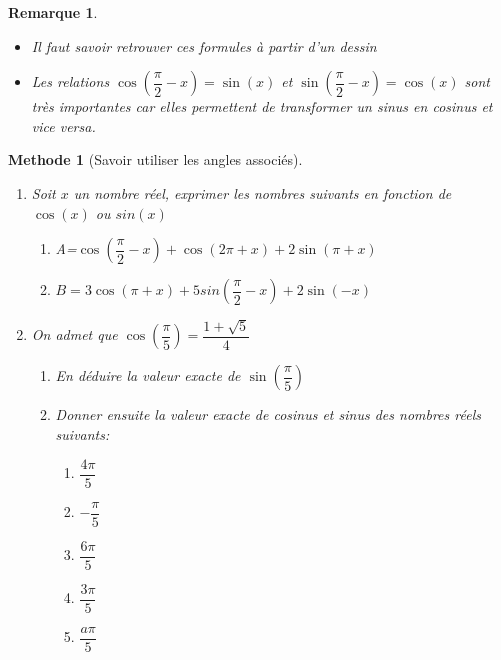 \documentclass[10pt,a4paper]{article}
\theoremstyle{break}
\newtheorem{Rem}{Remarque}
\newtheorem{Meth}{Methode}
\begin{document}
		\begin{Rem}
			\begin{itemize}
				\item Il faut savoir retrouver ces formules à partir d'un dessin
				\item Les relations $\cos(\dfrac{\pi}{2}-x)=\sin(x)$ et 	$\sin(\dfrac{\pi}{2}-x)=\cos(x)$ sont très importantes car elles permettent de transformer un sinus en cosinus et vice versa.
			\end{itemize}
		\end{Rem}
		\begin{Meth}[Savoir utiliser les angles associés]
		\begin{enumerate}
			\item Soit $x$ un nombre réel, exprimer les nombres suivants en fonction de $\cos(x)$ ou $sin(x)$
			\begin{enumerate}
				\item A=$\cos(\dfrac{\pi}{2}-x)+\cos(2\pi+x)+2\sin(\pi+x)$
				\item$ B=3\cos(\pi+x)+5sin(\dfrac{\pi}{2}-x)+2\sin(-x)$
			\end{enumerate}
			\item On admet que $\cos(\dfrac{\pi}{5})=\dfrac{1+\sqrt{5}}{4}$
			\begin{enumerate}
				\item En déduire la valeur exacte de $\sin(\dfrac{\pi}{5})$
				\item  Donner ensuite la valeur exacte de cosinus et sinus des nombres réels suivants:
				\begin{multicols}{5}
					\begin{enumerate}
						\item $\dfrac{4\pi}{5}$
						\item $-\dfrac{\pi}{5}$
						\item $\dfrac{6\pi}{5}$
						\item $\dfrac{3\pi}{5}$
						\item $\dfrac{a\pi}{5}$
					\end{enumerate}
				\end{multicols}
			\end{enumerate}
		\end{enumerate}
	\end{Meth}
\newpage
\end{document}
